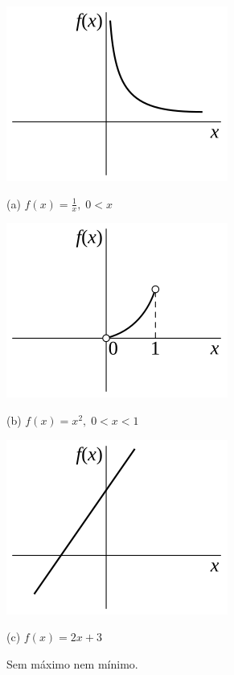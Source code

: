\begin{figure}
\begin{minipage}{38.67mm}
\begin{center}
\includegraphics{nomaxmin-a}

(a) $f(x) = \frac{1}{x}, \; 0 < x$
\end{center}
\end{minipage}%
\begin{minipage}{38.67mm}
\begin{center}
\includegraphics{nomaxmin-b}

(b) $f(x) = x^2, \; 0 < x < 1$
\end{center}
\end{minipage}%
\begin{minipage}{38.67mm}
\begin{center}
\includegraphics{nomaxmin-c}

(c) $f(x) = 2x + 3$
\end{center}
\end{minipage}
\caption{Sem máximo nem mínimo.}
\label{fig:nomaxmin}
\end{figure}

